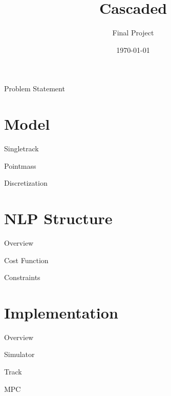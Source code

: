 \documentclass{beamer}
\title{Cascaded}
\subtitle{Final Project}
\author{}
\date{\today}
\begin{document}
\maketitle

\begin{frame}{Problem Statement}

\end{frame}

\section{Model}

\begin{frame}{Singletrack}
\end{frame}

\begin{frame}{Pointmass}
\end{frame}

\begin{frame}{Discretization}
\end{frame}

\section{NLP Structure}

\begin{frame}{Overview}
\end{frame}

\begin{frame}{Cost Function}
\end{frame}

\begin{frame}{Constraints}
\end{frame}

\section{Implementation}

\begin{frame}{Overview}
\end{frame}

\begin{frame}{Simulator}
\end{frame}

\begin{frame}{Track}
\end{frame}

\begin{frame}{MPC}
\end{frame}
\end{document}
